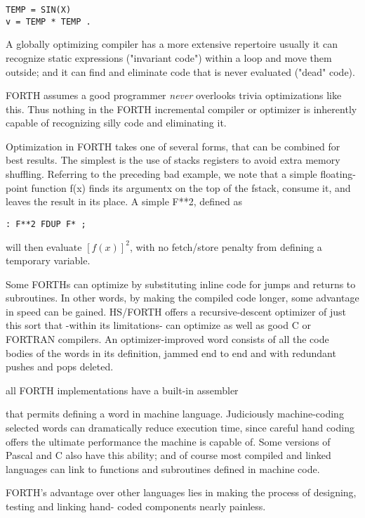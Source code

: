 \begin{verbatim}
TEMP = SIN(X)
v = TEMP * TEMP .
\end{verbatim}

A globally optimizing compiler has a more extensive repertoire
usually it can recognize static expressions ("invariant code")
within a loop and move them outside; and it can find and eliminate code that is
never evaluated ("dead" code).

FORTH assumes a good programmer \textit{never} overlooks trivia
optimizations like this. Thus nothing in the FORTH incremental
compiler or optimizer is inherently capable of recognizing silly
code and eliminating it.

Optimization in FORTH takes one of several forms, that can be
combined for best results. The simplest is the use of stacks
registers to avoid extra memory shuffling. Referring to the
preceding bad example, we note that a simple floating-point
function f(x) finds its argumentx on the top of the fstack, consume
it, and leaves the result in its place. A simple F**2, defined as

\begin{verbatim}
: F**2 FDUP F* ;
\end{verbatim}

will then evaluate $[f(x)]^2$, with no fetch/store penalty from defining
a temporary variable.

Some FORTHs can optimize by substituting inline code for jumps
and returns to subroutines. In other words, by making the compiled code longer,
some advantage in speed can be gained.
HS/FORTH offers a recursive-descent optimizer of just this sort
that -within its limitations- can optimize as well as good C or
FORTRAN compilers. An optimizer-improved word consists of
all the code bodies of the words in its definition, jammed end to
end and with redundant pushes and pops deleted.

 all FORTH implementations have a built-in assembler

that permits defining a word in machine language. Judiciously
machine-coding selected words can dramatically reduce execution time, since
careful hand coding offers the ultimate performance the machine is capable of.
Some versions of Pascal and C
also have this ability; and of course most compiled and linked
languages can link to functions and subroutines defined in
machine code.

FORTH’s advantage over other languages lies in making the 
process of designing, testing and linking hand- coded components
nearly painless.

